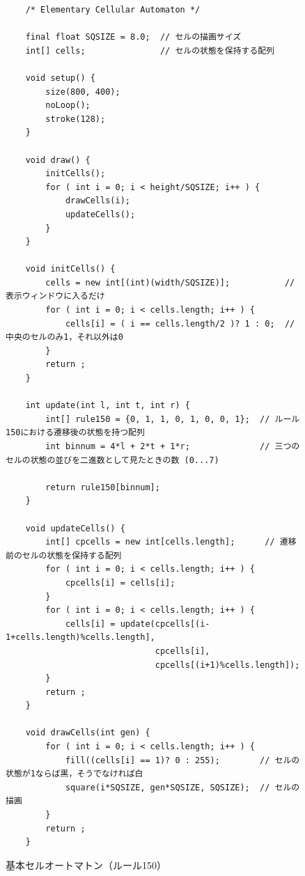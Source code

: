 \documentclass[dvipdfmx]{jsarticle}
\theoremstyle{definition}
\begin{document}
\begin{figure}[ht]
\begin{center}
\begin{oframed}
\footnotesize
\begin{verbatim}
    /* Elementary Cellular Automaton */

    final float SQSIZE = 8.0;  // セルの描画サイズ
    int[] cells;               // セルの状態を保持する配列

    void setup() {
        size(800, 400);
        noLoop();
        stroke(128);
    }

    void draw() {
        initCells();
        for ( int i = 0; i < height/SQSIZE; i++ ) {
            drawCells(i);
            updateCells();
        }
    }

    void initCells() {
        cells = new int[(int)(width/SQSIZE)];           // 表示ウィンドウに入るだけ
        for ( int i = 0; i < cells.length; i++ ) {
            cells[i] = ( i == cells.length/2 )? 1 : 0;  // 中央のセルのみ1，それ以外は0
        }
        return ;
    }

    int update(int l, int t, int r) {
        int[] rule150 = {0, 1, 1, 0, 1, 0, 0, 1};  // ルール150における遷移後の状態を持つ配列
        int binnum = 4*l + 2*t + 1*r;              // 三つのセルの状態の並びを二進数として見たときの数 (0...7)

        return rule150[binnum];
    }

    void updateCells() {
        int[] cpcells = new int[cells.length];      // 遷移前のセルの状態を保持する配列
        for ( int i = 0; i < cells.length; i++ ) {
            cpcells[i] = cells[i];
        }
        for ( int i = 0; i < cells.length; i++ ) {
            cells[i] = update(cpcells[(i-1+cells.length)%cells.length],
                              cpcells[i],
                              cpcells[(i+1)%cells.length]);
        }
        return ;
    }

    void drawCells(int gen) {
        for ( int i = 0; i < cells.length; i++ ) {
            fill((cells[i] == 1)? 0 : 255);        // セルの状態が1ならば黒，そうでなければ白
            square(i*SQSIZE, gen*SQSIZE, SQSIZE);  // セルの描画
        }
        return ;
    }
\end{verbatim}
\end{oframed}
\end{center}
\caption{基本セルオートマトン（ルール150）}
\end{figure}


\newpage{}
\end{document}
